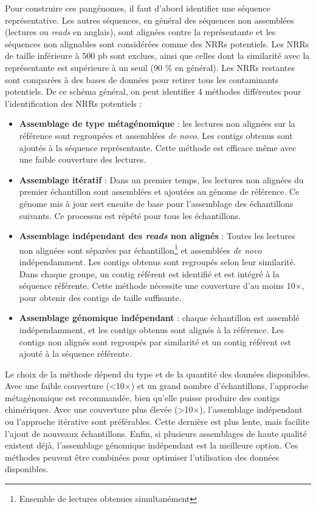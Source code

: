 Pour construire ces pangénomes, il faut d'abord identifier une séquence représentative. Les autres séquences, en général des séquences non assemblées (lectures ou \textit{reads} en anglais), sont alignées contre la représentante et les séquences non alignables sont considérées comme des NRRs potentiels. Les NRRs de taille inférieure à 500 pb sont exclues, ainsi que celles dont la similarité avec la représentante est supérieure à un seuil (90 \% en général). Les NRRs restantes sont comparées à des bases de données pour retirer tous les contaminants potentiels. De ce schéma général, on peut identifier 4 méthodes différentes pour l'identification des NRRs potentiels :
\begin{itemize}
    \item \textbf{Assemblage de type métagénomique} : les lectures non alignées sur la référence sont regroupées et assemblées \textit{de novo}. Les contigs obtenus sont ajoutés à la séquence représentante. Cette méthode est efficace même avec une faible couverture des lectures.
    \item \textbf{Assemblage itératif} : Dans un premier temps, les lectures non alignées du premier échantillon sont assemblées et ajoutées au génome de référence. Ce génome mis à jour sert ensuite de base pour l’assemblage des échantillons suivants. Ce processus est répété pour tous les échantillons.
\end{itemize}
\newpage
\begin{itemize}
    \item \textbf{Assemblage indépendant des \textit{reads} non alignés} : Toutes les lectures non alignées sont séparées par échantillon\footnote{Ensemble de lectures obtenues simultanément} et assemblées \textit{de novo} indépendamment. Les contigs obtenus sont regroupés selon leur similarité. Dans chaque groupe, un contig référent est identifié et est intégré à la séquence référente. Cette méthode nécessite une couverture d’au moins 10×, pour obtenir des contigs de taille suffisante.
    \item \textbf{Assemblage génomique indépendant} : chaque échantillon est assemblé indépendamment, et les contigs obtenus sont alignés à la référence. Les contigs non alignés sont regroupés par similarité et un contig référent est ajouté à la séquence référente.
\end{itemize}

Le choix de la méthode dépend du type et de la quantité des données disponibles. Avec une faible couverture (<10×) et un grand nombre d’échantillons, l’approche métagénomique est recommandée, bien qu’elle puisse produire des contigs chimériques. Avec une couverture plus élevée (>10×), l’assemblage indépendant ou l’approche itérative sont préférables. Cette dernière est plus lente, mais facilite l’ajout de nouveaux échantillons. Enfin, si plusieurs assemblages de haute qualité existent déjà, l’assemblage génomique indépendant est la meilleure option. Ces méthodes peuvent être combinées pour optimiser l’utilisation des données disponibles.
 
